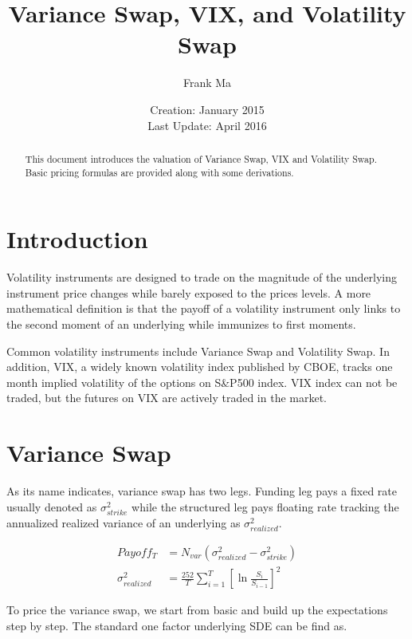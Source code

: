 \documentclass{article}
\title{Variance Swap, VIX, and Volatility Swap}
\author{Frank Ma}
\date{Creation: January 2015 \\ Last Update: April 2016}
\begin{document}
\maketitle

\begin{abstract}
    This document introduces the valuation of Variance Swap, VIX and Volatility Swap. Basic pricing formulas are provided along with some derivations.
\end{abstract}


\section{Introduction}

Volatility instruments are designed to trade on the magnitude of the underlying instrument price changes while barely exposed to the prices levels. A more mathematical definition is that the payoff of a volatility instrument only links to the second moment of an underlying while immunizes to first moments.

Common volatility instruments include Variance Swap and Volatility Swap. In addition, VIX, a widely known volatility index published by CBOE, tracks one month implied volatility of the options on S\&P500 index. VIX index can not be traded, but the futures on VIX are actively traded in the market.

\section{Variance Swap}

As its name indicates, variance swap has two legs. Funding leg pays a fixed rate usually denoted as $ \sigma_{strike}^2 $ while the structured leg pays floating rate tracking the annualized realized variance of an underlying as $ \sigma_{realized}^2 $.

\begin{subequations}
\begin{align}
    Payoff_T &= N_{var} \left(\sigma_{realized}^2 - \sigma_{strike}^2\right) \\
    \sigma_{realized}^2 &= \frac{252}{T} \sum_{i=1}^{T}{\left[\ln{\frac{S_{i}}{S_{i-1}}}\right]^2}
\end{align}
\end{subequations}

To price the variance swap, we start from basic and build up the expectations step by step. The standard one factor underlying SDE can be find as.
\end{document}
